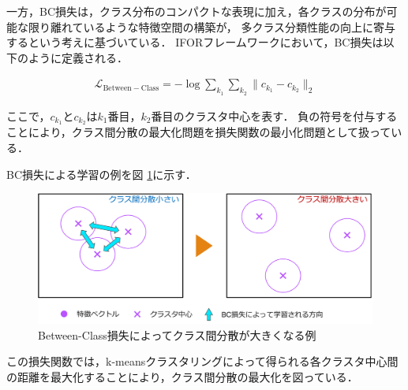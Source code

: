 一方，BC損失は，クラス分布のコンパクトな表現に加え，各クラスの分布が可能な限り離れているような特徴空間の構築が，
多クラス分類性能の向上に寄与するという考えに基づいている．
IFORフレームワークにおいて，BC損失は以下のように定義される．

\begin{align}
  \mathcal{L}_{\mathrm{Between-Class}} = -\log{\sum_{k_1} {\sum_{k_2} {\lVert c_{k_1} - c_{k_2} \rVert_2}}}
\end{align}

\noindent
ここで，$c_{k_1}$と$c_{k_2}$は$k_1$番目，$k_2$番目のクラスタ中心を表す．
負の符号を付与することにより，クラス間分散の最大化問題を損失関数の最小化問題として扱っている．

BC損失による学習の例を図 \ref{fig:bc_loss}に示す．
% 
\begin{figure}[tbp]
  \centering
  \includegraphics[width=\linewidth, keepaspectratio]{image/bc_loss.png}
  \caption{Between-Class損失によってクラス間分散が大きくなる例}
  \label{fig:bc_loss}
\end{figure}
%
この損失関数では，k-meansクラスタリングによって得られる各クラスタ中心間の距離を最大化することにより，クラス間分散の最大化を図っている．